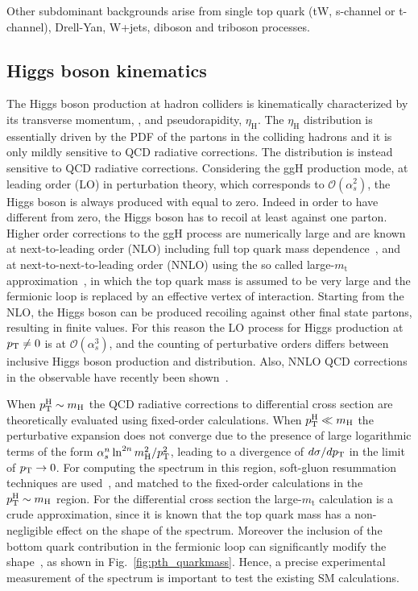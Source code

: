 Other subdominant backgrounds arise from single top quark (tW, s-channel or t-channel), Drell-Yan, W+jets, diboson and triboson processes.


\subsection{Higgs boson kinematics}

The Higgs boson production at hadron colliders is kinematically characterized by its transverse momentum, \pth, and pseudorapidity, $\eta_\mathrm{H}$. The $\eta_\mathrm{H}$ distribution is essentially driven by the PDF of the partons in the colliding hadrons and it is only mildly sensitive to QCD radiative corrections. The \pth distribution is instead sensitive to QCD radiative corrections. 
Considering the ggH production mode, at leading order (LO) in perturbation theory, which corresponds to $\mathcal{O}(\alpha_s^2)$, the Higgs boson is always produced with \pth equal to zero. Indeed in order to have \pt different from zero, the Higgs boson has to recoil at least against one parton. Higher order corrections to the ggH process are numerically large and are known at next-to-leading order (NLO) including full top quark mass dependence~\cite{Spira:1995rr,Harlander:2005rq}, and at next-to-next-to-leading order (NNLO) using the so called large-$m_\mathrm{t}$ approximation~\cite{Ravindran:2003um,Catani:2007vq,Anastasiou:2015ema}, in which the top quark mass is assumed to be very large and the fermionic loop is replaced by an effective vertex of interaction. Starting from the NLO, the Higgs boson can be produced recoiling against other final state partons, resulting in finite \pth values. For this reason the LO process for Higgs production at $p_\mathrm{T} \neq 0$ is at $\mathcal{O}(\alpha_s^3)$, and the counting of perturbative orders differs between inclusive Higgs boson production and \pth distribution. Also, NNLO QCD corrections in the \pth observable have recently been shown~\cite{Chen:2016zka}.

When $p_\mathrm{T}^\mathrm{H} \sim m_\mathrm{H}$ the QCD radiative corrections to \pth differential cross section are theoretically evaluated using fixed-order calculations. When $p_\mathrm{T}^\mathrm{H} \ll m_\mathrm{H}$ the perturbative expansion does not converge due to the presence of large logarithmic terms of the form $\alpha_s^n \ln^{2n}m_\mathrm{H}^2/p_\mathrm{T}^2$, leading to a divergence of $d\sigma/dp_\mathrm{T}$ in the limit of $p_\mathrm{T}\to0$. For computing the \pth spectrum in this region, soft-gluon resummation techniques are used~\cite{Bozzi:2005wk,deFlorian:2012mx}, and matched to the fixed-order calculations in the $p_\mathrm{T}^\mathrm{H} \sim m_\mathrm{H}$ region.
For the \pth differential cross section the large-$m_\mathrm{t}$ calculation is a crude approximation, since it is known that the top quark mass has a non-negligible effect on the shape of the spectrum. Moreover the inclusion of the bottom quark contribution in the fermionic loop can significantly modify the \pth shape~\cite{Grazzini:2013mca}, as shown in Fig.~\ref{fig:pth_quarkmass}. Hence, a precise experimental measurement of the \pth spectrum is important to test the existing SM calculations. 

